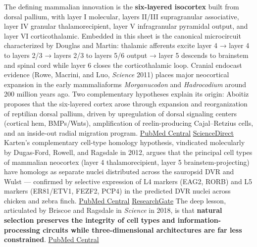 The defining mammalian innovation is the \textbf{six-layered isocortex} built from dorsal pallium, with layer I molecular, layers II/III supragranular associative, layer IV granular thalamorecipient, layer V infragranular pyramidal output, and layer VI corticothalamic. Embedded in this sheet is the canonical microcircuit characterized by Douglas and Martin: thalamic afferents excite layer 4 → layer 4 to layers 2/3 → layers 2/3 to layers 5/6 output → layer 5 descends to brainstem and spinal cord while layer 6 closes the corticothalamic loop. Cranial endocast evidence (Rowe, Macrini, and Luo, \emph{Science} 2011) places major neocortical expansion in the early mammaliaforms \emph{Morganucodon} and \emph{Hadrocodium} around 200 million years ago. Two complementary hypotheses explain its origin: Aboitiz proposes that the six-layered cortex arose through expansion and reorganization of reptilian dorsal pallium, driven by upregulation of dorsal signaling centers (cortical hem, BMPs/Wnts), amplification of reelin-producing Cajal--Retzius cells, and an inside-out radial migration program. \href{https://pmc.ncbi.nlm.nih.gov/articles/PMC4604247/}{PubMed Central} \href{https://www.sciencedirect.com/science/article/pii/S0301008220301209}{ScienceDirect} Karten's complementary cell-type homology hypothesis, vindicated molecularly by Dugas-Ford, Rowell, and Ragsdale in 2012, argues that the principal cell types of mammalian neocortex (layer 4 thalamorecipient, layer 5 brainstem-projecting) have homologs as separate nuclei distributed across the sauropsid DVR and Wulst --- confirmed by selective expression of L4 markers (EAG2, RORB) and L5 markers (ER81/ETV1, FEZF2, PCP4) in the predicted DVR nuclei across chicken and zebra finch. \href{https://pmc.ncbi.nlm.nih.gov/articles/PMC3479531/}{PubMed Central} \href{https://www.researchgate.net/publication/231742550_Cell-type_homologies_and_the_origins_of_the_neocortex}{ResearchGate} The deep lesson, articulated by Briscoe and Ragsdale in \emph{Science} in 2018, is that \textbf{natural selection preserves the integrity of cell types and information-processing circuits while three-dimensional architectures are far less constrained}. \href{https://pmc.ncbi.nlm.nih.gov/articles/PMC11098553/}{PubMed Central}


